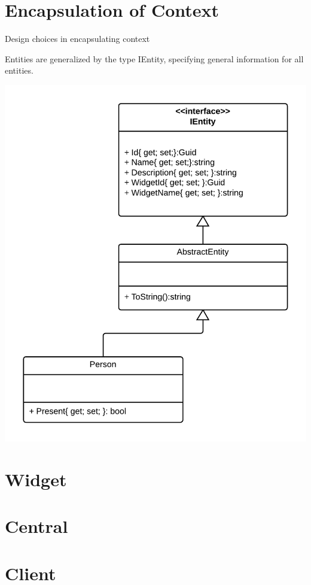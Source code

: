 \documentclass[]{report}
\begin{document}
\section{Encapsulation of Context}
Design choices in encapsulating context

Entities are generalized by the type IEntity, specifying general information for all entities.


\begin{center}
\includegraphics[scale=0.15]{ContextClassDiagram.png}
\end{center}


\section{Widget}

\section{Central}

\section{Client}
\end{document}
